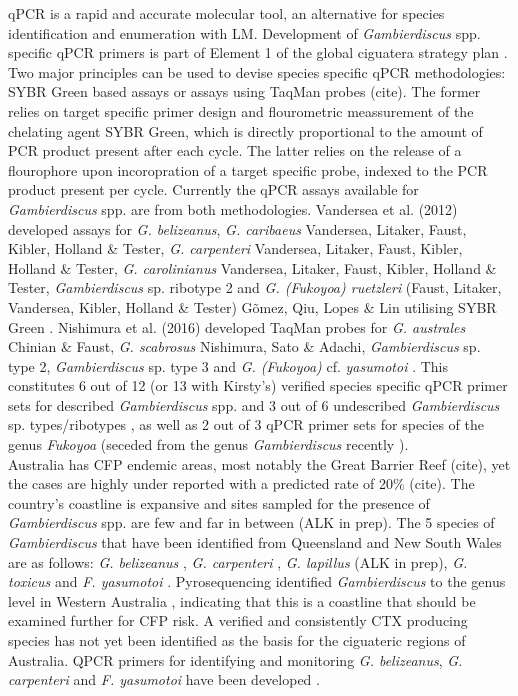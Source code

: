 \documentclass[12pt]{article}
\begin{document}
qPCR is a rapid and accurate molecular tool, an alternative for species identification and enumeration with LM. Development of \emph{Gambierdiscus} spp. specific qPCR primers is part of Element 1 of the global ciguatera strategy plan \cite{globalcig}. Two major principles can be used to devise species specific qPCR methodologies: SYBR Green based assays or assays using TaqMan probes (cite). The former relies on target specific primer design and flourometric meassurement of the chelating agent SYBR Green, which is directly proportional to the amount of PCR product present after each cycle. The latter relies on the release of a flourophore upon incoropration of a target specific probe, indexed to the PCR product present per cycle. Currently the qPCR assays available for  \emph{Gambierdiscus} spp. are from both methodologies. Vandersea et al. (2012) developed assays for \emph{G. belizeanus}, \emph{G. caribaeus} Vandersea, Litaker, Faust, Kibler, Holland \& Tester, \emph{G. carpenteri} Vandersea, Litaker, Faust, Kibler, Holland \& Tester, \emph{G. carolinianus} Vandersea, Litaker, Faust, Kibler, Holland \& Tester, \emph{Gambierdiscus} sp. ribotype 2 and \emph{G. (Fukoyoa) ruetzleri} (Faust, Litaker, Vandersea, Kibler, Holland \& Tester) G\~omez, Qiu, Lopes \& Lin utilising SYBR Green \cite{vandersea2012development}. Nishimura et al. (2016) developed TaqMan probes for  \emph{G. australes} Chinian \& Faust, \emph{G. scabrosus} Nishimura, Sato \& Adachi, \emph{Gambierdiscus} sp. type 2, \emph{Gambierdiscus} sp. type 3 and \emph{G. (Fukoyoa)} cf. \emph{yasumotoi} \cite{nishimura2016quantitative}. This constitutes 6 out of 12 (or 13 with Kirsty's) verified species specific qPCR primer sets for described \emph{Gambierdiscus} spp. and  3 out of 6 undescribed \emph{Gambierdiscus} sp. types/ribotypes , as well as 2 out of 3 qPCR primer sets for species of the genus \emph{Fukoyoa} (seceded from the genus \emph{Gambierdiscus} recently \cite{gomez2015fukuyoa}).\\
Australia has CFP endemic areas, most notably the Great Barrier Reef (cite), yet the cases are highly under reported with a predicted rate of 20\% (cite). The country's coastline is expansive and sites sampled for the presence of \emph{Gambierdiscus} spp. are few and far in between (ALK in prep). The 5 species of \emph{Gambierdiscus} that have been identified from Queensland and New South Wales are as follows:  \emph{G. belizeanus}  \citep{murray2014molecular}, \emph{G. carpenteri} \citep{kohli2014high}, \emph{G. lapillus} (ALK in prep), \emph{G. toxicus} \citep{hallegraeff2010algae} and \emph{F. yasumotoi}  \citep{murray2014molecular}. Pyrosequencing identified \emph{Gambierdiscus} to the genus level in Western Australia \cite{kohli2014cob} , indicating that this is a coastline that should be examined further for CFP risk. A verified and consistently CTX producing species has not yet been identified as the basis for the ciguateric regions of Australia. 
QPCR primers for identifying and monitoring \emph{G. belizeanus}, \emph{G. carpenteri} and \emph{F. yasumotoi} have been developed \cite{nishimura2016quantitative,vandersea2012development}.
\end{document}
